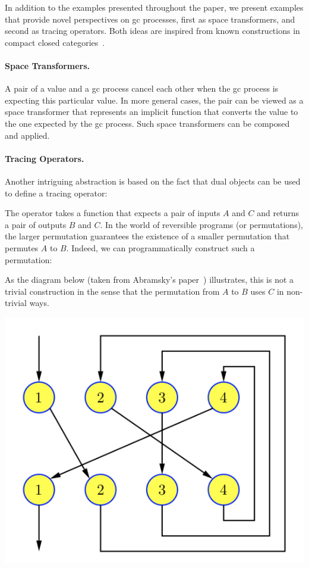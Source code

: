 \documentclass[sigplan,10pt,review,anonymous]{acmart}
\begin{document}
In addition to the examples presented throughout the paper, we present
examples that provide novel perspectives on gc processes, first as
space transformers, and second as tracing operators. Both ideas are
inspired from known constructions in compact closed
categories~\cite{dblp:conf/calco/abramsky05}.

\paragraph*{Space Transformers.} A pair of a value and a gc process
cancel each other when the gc process is expecting this particular
value. In more general cases, the pair can be viewed as a space
transformer that represents an implicit function that converts the value to the
one expected by the gc process. Such space transformers can be
composed and applied.

\PPFThof{}

\paragraph*{Tracing Operators.} Another intriguing abstraction is
based on the fact that dual objects can be used to define a tracing
operator:

\PPFTtrace{}

The operator takes a function that expects a pair of inputs $A$ and
$C$ and returns a pair of outputs $B$ and $C$. In the world of
reversible programs (or permutations), the larger permutation
guarantees the existence of a smaller permutation that permutes $A$ to
$B$. Indeed, we can programmatically construct such a permutation:

As the diagram below (taken from Abramsky's
paper~\cite{dblp:conf/calco/abramsky05}) illustrates, this is not a
trivial construction in the sense that the permutation from $A$ to $B$
uses $C$ in non-trivial ways.

\includegraphics[scale=0.5]{trace.png}
\end{document}
